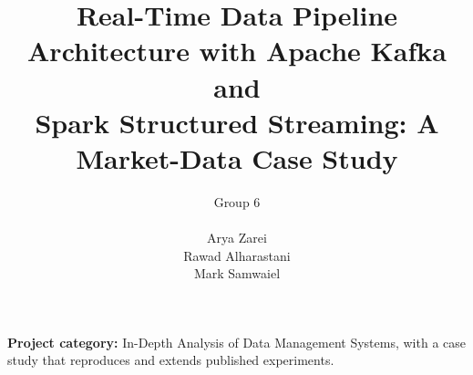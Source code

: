 \documentclass[11pt,letterpaper]{article}
\title{Real-Time Data Pipeline Architecture with Apache Kafka and\\
Spark Structured Streaming: A Market-Data Case Study}
\author{Group 6\\[4pt]
\begin{tabular}{l}Arya Zarei\\Rawad Alharastani\\Mark Samwaiel\end{tabular}}
\date{}
\begin{document}
\maketitle

\noindent\textbf{Project category:} In-Depth Analysis of Data Management Systems, with a case study that
reproduces and extends published experiments.


\end{document}
